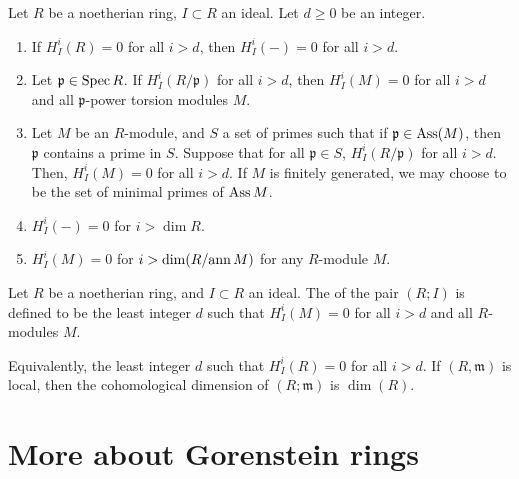 \documentclass[12pt]{article}
\begin{document}
\begin{prop}
	Let $R$ be a noetherian ring, $I \subset R$ an ideal. Let $d \ge 0$ be an integer.
	\begin{enumerate}[label=(\alph*)]
		\item If $H_{I}^{i}(R) = 0$ for all $i > d$, then $H_{I}^{i}(-) = 0$ for all $i > d$.
		\item Let $\mathfrak{p} \in \operatorname{Spec} R$. If $H_{I}^{i}(R/\mathfrak{p})$ for all $i > d$, then $H_{I}^{i}(M) = 0$ for all $i > d$ and all $\mathfrak{p}$-power torsion modules $M$.
		\item Let $M$ be an $R$-module, and $S$ a set of primes such that if $\mathfrak{p} \in \operatorname{Ass}(M)$, then $\mathfrak{p}$ contains a prime in $S$. Suppose that for all $\mathfrak{p} \in S$, $H_{I}^{i}(R/\mathfrak{p})$ for all $i > d$. Then, $H_{I}^{i}(M) = 0$ for all $i > d$. \newline
		If $M$ is finitely generated, we may choose to be the set of minimal primes of $\operatorname{Ass} M$.
		\item $H_{I}^{i}(-) = 0$ for $i > \dim R$.
		\item $H_{I}^{i}(M) = 0$ for $i > \dim(R/{\operatorname{ann} M})$ for any $R$-module $M$.
	\end{enumerate}
\end{prop}

\begin{defn}
	Let $R$ be a noetherian ring, and $I \subset R$ an ideal. The  of the pair $(R; I)$ is defined to be the least integer $d$ such that $H_{I}^{i}(M) = 0$ for all $i > d$ and all $R$-modules $M$.
\end{defn}
Equivalently, the least integer $d$ such that $H_{I}^{i}(R) = 0$ for all $i > d$. \newline
If $(R, \mathfrak{m})$ is local, then the cohomological dimension of $(R; \mathfrak{m})$ is $\dim(R)$.

\section{More about Gorenstein rings}
\end{document}

